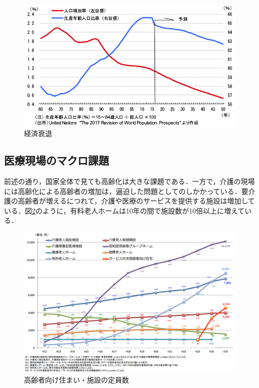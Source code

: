 \begin{figure}[htb]
 \begin{center}
 \includegraphics[scale=0.6]{figures/population_GDP_relation}
 \caption[経済衰退]{経済衰退 \label{population_GDP_relation}}
 \end{center}
\end{figure}

\subsection{医療現場のマクロ課題}

前述の通り，国家全体で見ても高齢化は大きな課題である．一方で，介護の現場には高齢化による高齢者の増加は，逼迫した問題としてのしかかっている．要介護の高齢者が増えるにつれて，介護や医療のサービスを提供する施設は増加している．図\ref{nurse_facility_increase}のように，有料老人ホームは10年の間で施設数が10倍以上に増えている．

\begin{figure}[htb]
 \begin{center}
 \includegraphics[scale=0.4]{figures/nurse_facility_increase}
 \caption[高齢者向け住まい・施設の定員数]{高齢者向け住まい・施設の定員数 \label{nurse_facility_increase}}
 \end{center}
\end{figure}


